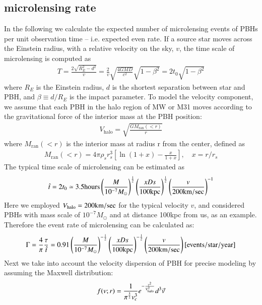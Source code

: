 \documentclass[iop, apj]{emulateapj}
\newcommand{\?}{\stackrel{?}{=}}
\begin{document}
\subsection{microlensing rate}

In the following we calculate the expected number of microlensing events of PBHs per unit observation time -- i.e. expected even rate. 
If a source star moves across the Einstein radius, with a relative velocity on the sky, $v$, the time scale of microlensing is computed as
%
\begin{eqnarray}
T=\frac{2\sqrt{R^2_E-d^2}}{v} = \frac{2}{v} \sqrt{\frac{4GMD}{c^2}}\sqrt{1-\beta^2}=2t_0\sqrt{1-\beta^2}
\end{eqnarray}
%
where $R_E$ is the Einstein radius, $d$ is the shortest separation between star and PBH, and $\beta \equiv d/R_E$ is the impact parameter. 
To model the velocity component, we assume that each PBH in the halo region of MW or M31 moves according to the gravitational force of the interior mass at the PBH position: 
%
\begin{eqnarray}
V_\mathrm{halo}=\sqrt{\frac{GM_\mathrm{ran}(<r)}{r}}
\end{eqnarray}
%
where $M_\mathrm{ran}(<r)$ is the interior mass at radius r from the center, defined as
%
\begin{eqnarray}
M_\mathrm{ran}(<r)=4\pi\rho_sr^3_s\left[\ln(1+x)-\frac{x}{1+x}\right],\quad x=r/r_s
\end{eqnarray}
%
The typical time scale of microlensing can be estimated as
%
\begin{eqnarray}
\hat t =2t_0\simeq3.5{\rm hours} \left(\frac{M}{10^{-7}M_\odot}\right)^{\frac{1}{2}}\left(\frac{xDs}{100 \rm{kpc}}\right)^{\frac{1}{2}} \left(\frac{v}{200\rm{km/sec}}\right)^{-1}
\end{eqnarray}
%
Here we employed $V_\mathrm{halo}=200\rm{km/sec}$ for the typical velocity $v$, and considered PBHs with mass scale of $10^{-7}M_\odot$ and at distance 100kpc from us, as an example. 
Therefore the event rate of microlensing can be calculated as:
%
\begin{eqnarray}
\Gamma = \frac{4}{\pi}\frac{\tau}{\hat t}=0.91\left(\frac{M}{10^{-7}M_\odot}\right)^{-\frac{1}{2}}\left(\frac{xDs}{100 \rm{kpc}}\right)^{-\frac{1}{2}} \left(\frac{v}{200\rm{km/sec}}\right) [{\rm events/star/year}]
\end{eqnarray}
%
Next we take into account the velocity dispersion of PBH for precise modeling by assuming the Maxwell distribution: 
%
\begin{eqnarray}
f(v;r)=\frac{1}{\pi^{\frac{3}{2}}v^3_{c}}e^{-\frac{v^2}{V^2_{\rm halo}}}d^3 \vec{v}
\end{eqnarray}
\end{document}
